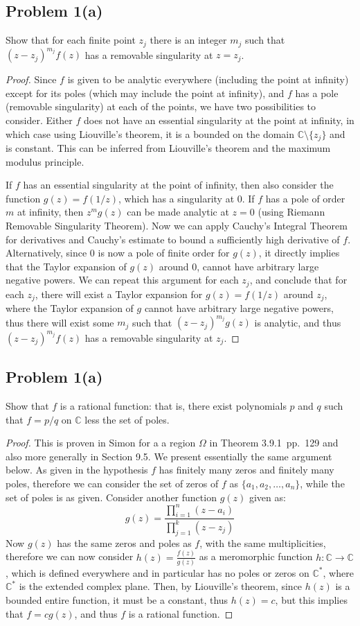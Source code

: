 \documentclass{article}[12pt]
\def\CC{{\mathbb C}}
\begin{document}
\subsection*{Problem 1(a)} Show that for each finite point $z_j$
there is an integer $m_j$ such that $(z-z_j)^{m_j}f(z)$ has a
removable singularity at $z=z_j$.
\begin{proof}
Since $f$ is given to be analytic everywhere (including the
point at infinity) except for its poles (which may include the
point at infinity), and $f$ has a pole (removable singularity)
at each of the points, we have two possibilities to consider.
Either $f$ does not have an essential singularity at the point
at infinity, in which case using Liouville's theorem, it is a
bounded on the domain $\CC\setminus \{z_j\}$ and is constant.
This can be inferred from Liouville's theorem and the maximum
modulus principle. 

If $f$ has an essential singularity at the point of infinity, then
also consider the function $g(z)=f(1/z)$, which has a singularity
at 0. If $f$ has a pole of order $m$ at infinity, then $z^mg(z)$
can be made analytic at $z=0$ (using Riemann Removable Singularity
Theorem). Now we can apply Cauchy's Integral Theorem for derivatives
and Cauchy's estimate to bound a sufficiently high derivative of $f$.
Alternatively, since 0 is now a pole of finite order for $g(z)$, it
directly implies that the Taylor expansion of $g(z)$ around 0, cannot
have arbitrary large negative powers. We can repeat this argument
for each $z_j$, and conclude that for each $z_j$, there will exist
a Taylor expansion for $g(z)=f(1/z)$ around $z_j$, where 
the Taylor expansion of $g$ cannot have arbitrary large negative
powers, thus there will exist some $m_j$ such that $(z-z_j)^{m_j}g(z)$
is analytic, and thus $(z-z_j)^{m_j}f(z)$ has a removable singularity
at $z_j$.
\end{proof}

\subsection*{Problem 1(a)}Show that $f$ is a rational function: that is,
there exist polynomials $p$ and $q$ such that $f=p/q$ on $\CC$ less
the set of poles.
\begin{proof}
This is proven in Simon for a a region $\Omega$ in Theorem 3.9.1~pp.~129
and also more generally in Section 9.5. We present essentially the
same argument below.
As given in the hypothesis $f$ has finitely many zeros and finitely many
poles, therefore we can consider the set of zeros of $f$ as
$\{a_1,a_2,\ldots,a_n\}$, while the set of poles is as given.
Consider another function $g(z)$ given as:
\[
g(z)= \frac{\prod_{i=1}^n (z-a_i)}{\prod_{j=1}^k (z-z_j)}
\]
Now $g(z)$ has the same zeros and poles as $f$, with the same 
multiplicities, therefore we can now consider $h(z)=\frac{f(z)}{g(z)}$
as a meromorphic function $h:\CC\to\CC$, which is defined
everywhere and in particular has no poles or zeros on $\CC^*$, where
$\CC^*$ is the extended complex plane. 
Then, by Liouville's theorem,
since $h(z)$ is a bounded entire function, it must be a constant,
thus $h(z)=c$, but this implies that $f=cg(z)$, and thus $f$ is
a rational function.
\end{proof}
\end{document}
